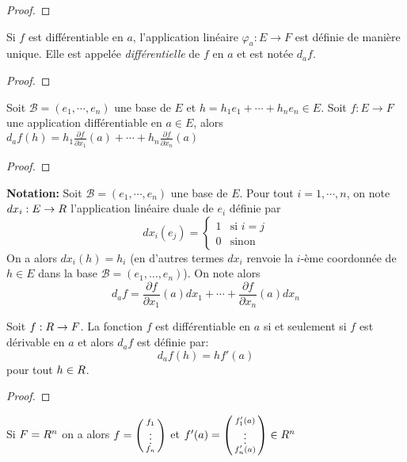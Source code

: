 \begin{proof}
    \pl{\rep{5cm}}
\end{proof}

\begin{defprop}
    Si $f$ est différentiable en $a$, l'application linéaire $\varphi_a: E \to F$ est définie de manière unique. Elle est appelée \emph{différentielle} de $f$ en $a$ et est notée $d_a f$.
\end{defprop}

\begin{proof}
    \pl{\rep{4cm}}
\end{proof}

\begin{proposition}
    Soit  $\mathcal B=(e_1,\cdots,e_n)$ une base de $E$ et $h = h_1 e_1 + \cdots + h_n e_n \in E$. Soit $f:E\to F$ une application différentiable en $a\in E$, alors $d_a f(h) = h_1\frac{\partial f}{\partial x_1}(a) + \cdots + h_n \frac{\partial f}{\partial x_n}(a)$	
\end{proposition}

\begin{proof}
    \pl{\rep{4cm}}
\end{proof}

{\bf \sffamily Notation:} Soit $\mathcal B=(e_1,\cdots,e_n)$ une base de $E$. Pour tout $i=1,\cdots,n$, on note  $dx_i: E \to R $ l'application linéaire duale de $e_i$ définie par 
\[
    dx_i (e_j) = \begin{cases}
        1 & \text{si $i=j$} \\
        0 & \text{sinon}
    \end{cases}
\]
On a alors $dx_i(h)= h_i$ (en d'autres termes $dx_i$ renvoie la $i$-ème coordonnée de $h\in E$ dans la base $\mathcal B = (e_1,\ldots,e_n)$). On note alors
\[
    d_a f = \frac{\partial f}{\partial x_1} (a)dx_1 + \cdots +\frac{\partial f}{\partial x_n}(a) dx_n 
\]

\begin{proposition}[(Cas de $ \boldsymbol {E=\R}$)]
    Soit $f: R \to F$. La fonction $f$ est différentiable en $a$ si et seulement si $f$ est dérivable en $a$ et alors $d_af$ est définie par:
    \[
        d_af(h) = h f'(a)
    \]
    pour tout $h\in R$.
\end{proposition}

\begin{proof}
    \pl{\rep{4cm}}
\end{proof}

\begin{remark}
    Si $F=R^n$ on a alors $f = \begin{psmallmatrix}
        f_1\\ \vdots \\ f_n
    \end{psmallmatrix}$ et  $f'(a) = \begin{psmallmatrix}
        f'_1(a) \\ \vdots \\ f'_n(a)
    \end{psmallmatrix}\in R^n$
\end{remark}

